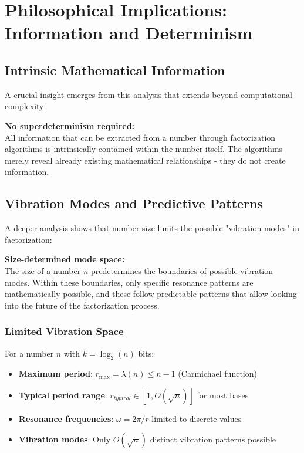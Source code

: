 	\section{Philosophical Implications: Information and Determinism}
	
	\subsection{Intrinsic Mathematical Information}
	
	A crucial insight emerges from this analysis that extends beyond computational complexity:
	
	\begin{tcolorbox}[colback=blue!10,colframe=blue!50,title=Fundamental Principle]
		\textbf{No superdeterminism required:} \\
		All information that can be extracted from a number through factorization algorithms is intrinsically contained within the number itself. The algorithms merely reveal already existing mathematical relationships - they do not create information.
	\end{tcolorbox}
	
	\subsection{Vibration Modes and Predictive Patterns}
	
	A deeper analysis shows that number size limits the possible "vibration modes" in factorization:
	
	\begin{tcolorbox}[colback=purple!10,colframe=purple!50,title=Vibration Limitation Principle]
		\textbf{Size-determined mode space:} \\
		The size of a number $n$ predetermines the boundaries of possible vibration modes. Within these boundaries, only specific resonance patterns are mathematically possible, and these follow predictable patterns that allow looking into the future of the factorization process.
	\end{tcolorbox}
	
	\subsubsection{Limited Vibration Space}
	
	For a number $n$ with $k = \log_2(n)$ bits:
	
	\begin{itemize}
		\item \textbf{Maximum period}: $r_{\max} = \lambda(n) \leq n-1$ (Carmichael function)
		\item \textbf{Typical period range}: $r_{typical} \in [1, O(\sqrt{n})]$ for most bases
		\item \textbf{Resonance frequencies}: $\omega = 2\pi/r$ limited to discrete values
		\item \textbf{Vibration modes}: Only $O(\sqrt{n})$ distinct vibration patterns possible
	\end{itemize}
	
